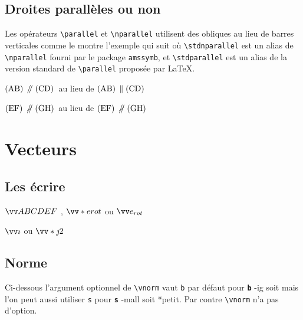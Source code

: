 \documentclass[12pt,a4paper]{book}
\makeatletter
\newcommand\env[1]{\texttt{#1}}
\newcommand\macro[1]{\env{\textbackslash{}#1}}
\theoremstyle{definition}
\newcommand\whyprefix[2]{%
	\textbf{\prefix{#1}}-#2%
}
\newcommand\prefix[1]{%
	\texttt{#1}%
}
\newcommand\inenglish{\@ifstar{\@inenglish@star}{\@inenglish@no@star}}
\newcommand\@inenglish@star[1]{%
	\emph{\og #1 \fg}%
}
\newcommand\@inenglish@no@star[1]{%
	\@inenglish@star{#1} en anglais%
}
\newcounter{paraexample}[subsubsection]
\newcommand\@newexample@abstract[2]{%
	\paragraph{%
		#1%
		\if\relax\detokenize{#2}\relax\else {} -- #2\fi%
	}%
}
\newcommand\newparaexample{\@ifstar{\@newparaexample@star}{\@newparaexample@no@star}}
\newcommand\@newparaexample@no@star[1]{%
	\refstepcounter{paraexample}%
	\@newexample@abstract{Exemple \theparaexample}{#1}%
}
\newcommand\@newparaexample@star[1]{%
	\@newexample@abstract{Exemple}{#1}%
}
\makeatother
\begin{document}
{{\subsection{Droites parallèles ou non}

Les opérateurs \macro{parallel} et \macro{nparallel} utilisent des obliques au lieu de barres verticales comme le montre l'exemple qui suit où \macro{stdnparallel} est un alias de \macro{nparallel} fourni par le package \verb+amssymb+, et \macro{stdparallel} est un alias de la version standard de \macro{parallel} proposée par \LaTeX{}.

\begin{latexex}
$\pgline{A}{B} \parallel \pgline{C}{D}$
au lieu de
$\pgline{A}{B}
 \stdparallel \pgline{C}{D}$

$\pgline{E}{F} \nparallel \pgline{G}{H}$
au lieu de
$\pgline{E}{F}
 \stdnparallel \pgline{G}{H}$
\end{latexex}


\section{Vecteurs}

\subsection{Les écrire}

\newparaexample{}

\begin{latexex}
$\vect{ABCDEF}$  ,
$\vect*{e}{rot}$ ou
$\vect{e_{rot}}$
\end{latexex}




\newparaexample{}

\begin{latexex}
$\vect{i}$ ou
$\vect*{j}{2}$
\end{latexex}



\subsection{Norme}

Ci-dessous l'argument optionnel de \macro{vnorm} vaut \prefix{b} par défaut pour \whyprefix{b}{ig} soit \inenglish{gros} mais l'on peut aussi utiliser \prefix{s} pour \whyprefix{s}{mall} soit \inenglish*{petit}. Par contre \macro{vnorm} n'a pas d'option.

}}
\end{document}

